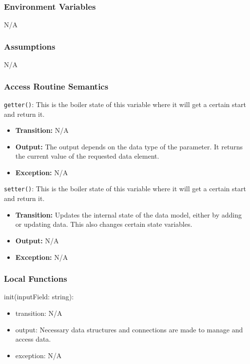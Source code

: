 \documentclass[12pt, titlepage]{article}
\begin{document}
\subsubsection{Environment Variables}

N/A

\subsubsection{Assumptions}

N/A

\subsubsection{Access Routine Semantics}

\noindent \texttt{getter()}: This is the boiler state of this variable where it will get a certain start and return it.
\begin{itemize}
    \item \textbf{Transition:} N/A
    \item \textbf{Output:} The output depends on the data type of the parameter. It returns the current value of the requested data element.
    \item \textbf{Exception:} N/A
\end{itemize}

\noindent \texttt{setter()}: This is the boiler state of this variable where it will get a certain start and return it.
\begin{itemize}
    \item \textbf{Transition:} Updates the internal state of the data model, either by adding or updating data. This also changes certain state variables.
    \item \textbf{Output:} N/A
    \item \textbf{Exception:} N/A
\end{itemize}

\subsubsection{Local Functions}

\noindent init(inputField: string):
\begin{itemize}
\item transition: N/A
\item output: Necessary data structures and connections are made to manage and access data.
\item exception: N/A
\end{itemize}
\end{document}
